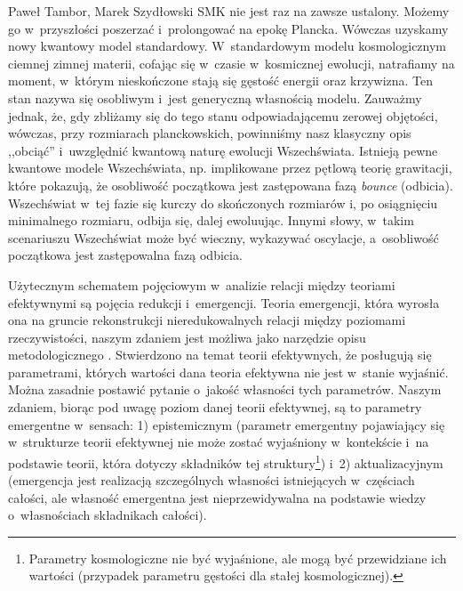 \begin{artplenv}{Paweł Tambor, Marek Szydłowski}
 SMK nie jest raz na zawsze ustalony. Możemy go w~przyszłości poszerzać i~prolongować na epokę Plancka. Wówczas uzyskamy nowy kwantowy model standardowy. W~standardowym modelu kosmologicznym ciemnej zimnej materii, cofając się w~czasie w~kosmicznej ewolucji, natrafiamy na moment, w~którym nieskończone stają się gęstość energii oraz krzywizna. Ten stan nazywa się osobliwym i~jest generyczną własnością modelu. Zauważmy jednak, że, gdy zbliżamy się do tego stanu odpowiadającemu zerowej objętości, wówczas, przy rozmiarach planckowskich, powinniśmy nasz klasyczny opis ,,obciąć'' i~uwzględnić kwantową naturę ewolucji Wszechświata. Istnieją pewne kwantowe modele Wszechświata, np. implikowane przez pętlową teorię grawitacji, które pokazują, że osobliwość początkowa jest zastępowana fazą \textit{bounce} (odbicia). Wszechświat w~tej fazie się kurczy do skończonych rozmiarów i, po osiągnięciu minimalnego rozmiaru, odbija się, dalej ewoluując. Innymi słowy, w~takim scenariuszu Wszechświat może być wieczny, wykazywać oscylacje, a~osobliwość początkowa jest zastępowalna fazą odbicia.

Użytecznym schematem pojęciowym w~analizie relacji między teoriami efektywnymi są pojęcia redukcji i~emergencji. Teoria emergencji, która wyrosła ona na gruncie rekonstrukcji nieredukowalnych relacji między poziomami rzeczywistości, naszym zdaniem jest możliwa jako narzędzie opisu metodologicznego
\parencite[][]{kim_making_1999}. %
 Stwierdzono na temat teorii efektywnych, że posługują się parametrami, których wartości dana teoria efektywna nie jest w~stanie wyjaśnić. Można zasadnie postawić pytanie o~jakość własności tych parametrów. Naszym zdaniem, biorąc pod uwagę poziom danej teorii efektywnej, są to parametry emergentne w~sensach: 1) epistemicznym (parametr emergentny pojawiający się w~strukturze teorii efektywnej nie może zostać wyjaśniony w~kontekście i~na podstawie teorii, która dotyczy składników tej struktury\footnote{Parametry kosmologiczne nie być wyjaśnione, ale mogą być przewidziane ich wartości (przypadek parametru gęstości dla stałej kosmologicznej).}) i~2) aktualizacyjnym (emergencja jest realizacją szczególnych własności istniejących w~częściach całości, ale własność emergentna jest nieprzewidywalna na podstawie wiedzy o~własnościach składnikach całości).


\end{artplenv}

